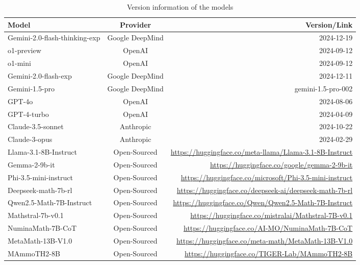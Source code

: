 \begin{table*}[htbp]
\caption{Version information of the models}
\centering 
\begin{tabular}{lcr}
 \toprule
\textbf{Model} & \textbf{Provider} & \textbf{Version/Link} \\
\midrule
Gemini-2.0-flash-thinking-exp & Google DeepMind & 2024-12-19 \\
o1-preview & OpenAI & 2024-09-12\\
o1-mini & OpenAI & 2024-09-12\\
\midrule
Gemini-2.0-flash-exp & Google DeepMind& 2024-12-11\\
Gemini-1.5-pro & Google DeepMind& gemini-1.5-pro-002 \\
GPT-4o & OpenAI & 2024-08-06 \\
GPT-4-turbo &OpenAI & 2024-04-09\\
Claude-3.5-sonnet & Anthropic& 2024-10-22\\
Claude-3-opus &Anthropic& 2024-02-29\\
\midrule
Llama-3.1-8B-Instruct&  Open-Sourced & \url{https://huggingface.co/meta-llama/Llama-3.1-8B-Instruct}\\
Gemma-2-9b-it & Open-Sourced & \url{https://huggingface.co/google/gemma-2-9b-it}\\
Phi-3.5-mini-instruct &  Open-Sourced& \url{https://huggingface.co/microsoft/Phi-3.5-mini-instruct} \\
\midrule
Deepseek-math-7b-rl & Open-Sourced& \url{https://huggingface.co/deepseek-ai/deepseek-math-7b-rl}\\
Qwen2.5-Math-7B-Instruct & Open-Sourced& \url{https://huggingface.co/Qwen/Qwen2.5-Math-7B-Instruct}\\
Mathstral-7b-v0.1& Open-Sourced& \url{https://huggingface.co/mistralai/Mathstral-7B-v0.1}\\ 
NuminaMath-7B-CoT & Open-Sourced& \url{https://huggingface.co/AI-MO/NuminaMath-7B-CoT} \\
MetaMath-13B-V1.0& Open-Sourced& \url{https://huggingface.co/meta-math/MetaMath-13B-V1.0}\\
MAmmoTH2-8B & Open-Sourced& \url{https://huggingface.co/TIGER-Lab/MAmmoTH2-8B}\\
\bottomrule
\end{tabular}
\label{tab:model}
\end{table*}

